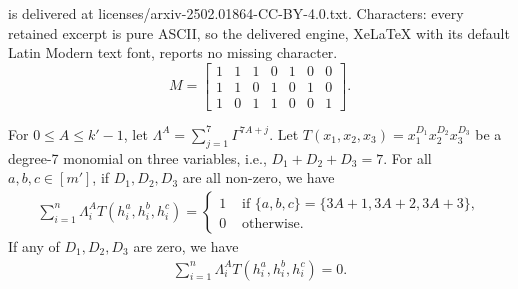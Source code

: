 \documentclass[10pt,a4paper]{amsart}
\renewcommand{\le}{\leqslant}
\begin{document}
is delivered at licenses/arxiv-2502.01864-CC-BY-4.0.txt. Characters: every retained excerpt is pure ASCII, so the delivered engine, XeLaTeX with its default Latin Modern text font, reports no missing character.
\begin{equation}\label{eq:matrix_M}
    M = 
    \begin{bmatrix}
        1 & 1 & 1 & 0 & 1 & 0 & 0 \\
        1 & 1 & 0 & 1 & 0 & 1 & 0 \\
        1 & 0 & 1 & 1 & 0 & 0 & 1
    \end{bmatrix}.
\end{equation}

\begin{lemma}\label{lem:extended_orthogonality}
    For $0\le A\le k'-1$, let $\Lambda^A = \sum_{j=1}^7 \Gamma^{7A+j}$. 
    Let $T(x_1, x_2, x_3) = x_1^{D_1}x_2^{D_2}x_3^{D_3}$ be a degree-7 monomial on three variables, i.e., $D_1 + D_2 + D_3 = 7$.
    For all $a, b, c\in [m']$, if $D_1,D_2,D_3$ are all non-zero, 
    we have
    \begin{align}
        \label{eq:intrablock_lem_1}
        \sum_{i=1}^n \Lambda^A_iT(h^{a}_i, h^b_i,h^c_i) = 
        \begin{cases}
            1 &\text{ if } \{a, b, c\} = \{3A+1, 3A+2, 3A + 3\}, \\
            0 &\text{ otherwise.}
        \end{cases}
    \end{align}
    If any of $D_1,D_2,D_3$ are zero, 
    we have
    \begin{align}
    \label{eq:intrablock_lem_2}
        \sum_{i=1}^n \Lambda^A_iT(h^{a}_i, h^b_i,h^c_i) = 0.
    \end{align}
\end{lemma}
\end{document}
